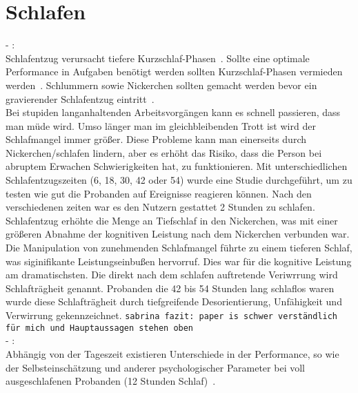 \section{Schlafen}\label{sec:relatedWork.schlafen}

- \cite{dinges1985assessing}:\\

Schlafentzug verursacht tiefere Kurzschlaf-Phasen~\cite{dinges1985assessing}. Sollte eine optimale Performance in Aufgaben benötigt werden sollten Kurzschlaf-Phasen vermieden werden~\cite{dinges1985assessing}. Schlummern sowie Nickerchen sollten gemacht werden bevor ein gravierender Schlafentzug eintritt~\cite{dinges1985assessing}.\\
Bei stupiden langanhaltenden Arbeitsvorgängen kann es schnell passieren, dass man müde wird. Umso länger man im gleichbleibenden Trott ist wird der Schlafmangel immer größer. Diese Probleme kann man einerseits durch Nickerchen/schlafen lindern, aber es erhöht das Risiko, dass die Person bei abruptem Erwachen Schwierigkeiten hat, zu funktionieren. Mit unterschiedlichen Schlafentzugszeiten (6, 18, 30, 42 oder 54) wurde eine Studie durchgeführt, um zu testen wie gut die Probanden auf Ereignisse reagieren können. Nach den verschiedenen zeiten war es den Nutzern gestattet 2 Stunden zu schlafen. Schlafentzug erhöhte die Menge an Tiefschlaf in den Nickerchen, was mit einer größeren Abnahme der kognitiven Leistung nach dem Nickerchen verbunden war.\\
Die Manipulation von zunehmenden Schlafmangel führte zu einem tieferen Schlaf, was siginifikante Leistungseinbußen hervorruf. Dies war für die kognitive Leistung am dramatischsten. Die direkt nach dem schlafen auftretende Veriwrrung wird Schlafträgheit genannt. Probanden die 42 bis 54 Stunden lang schlaflos waren wurde diese Schlafträgheit durch tiefgreifende Desorientierung, Unfähigkeit und Verwirrung gekennzeichnet.
\texttt{sabrina fazit: paper is schwer verständlich für mich und Hauptaussagen stehen oben}\\

- \cite{kraemer2000time}:\\

Abhängig von der Tageszeit existieren Unterschiede in der Performance, so wie der Selbsteinschätzung und anderer psychologischer Parameter bei voll ausgeschlafenen Probanden (12 Stunden Schlaf)~\cite{kraemer2000time}.\\

